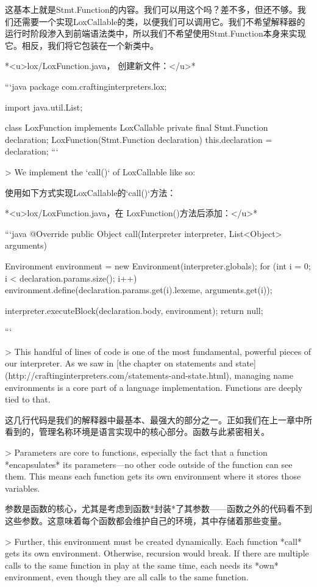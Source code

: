 \documentclass[cn,11pt,chinese]{elegantbook}
\begin{document}
{{{{{{{{这基本上就是Stmt.Function的内容。我们可以用这个吗？差不多，但还不够。我们还需要一个实现LoxCallable的类，以便我们可以调用它。我们不希望解释器的运行时阶段渗入到前端语法类中，所以我们不希望使用Stmt.Function本身来实现它。相反，我们将它包装在一个新类中。

*<u>lox/LoxFunction.java， 创建新文件：</u>*

```java
package com.craftinginterpreters.lox;

import java.util.List;

class LoxFunction implements LoxCallable {
  private final Stmt.Function declaration;
  LoxFunction(Stmt.Function declaration) {
    this.declaration = declaration;
  }
}
```

> We implement the `call()` of LoxCallable like so:

使用如下方式实现LoxCallable的`call()`方法：

*<u>lox/LoxFunction.java，在 LoxFunction()方法后添加：</u>*

```java
  @Override
  public Object call(Interpreter interpreter,
                     List<Object> arguments) {
    Environment environment = new Environment(interpreter.globals);
    for (int i = 0; i < declaration.params.size(); i++) {
      environment.define(declaration.params.get(i).lexeme,
          arguments.get(i));
    }

    interpreter.executeBlock(declaration.body, environment);
    return null;
  }
```

> This handful of lines of code is one of the most fundamental, powerful pieces of our interpreter. As we saw in [the chapter on statements and state](http://craftinginterpreters.com/statements-and-state.html), managing name environments is a core part of a language implementation. Functions are deeply tied to that.

这几行代码是我们的解释器中最基本、最强大的部分之一。正如我们在上一章中所看到的，管理名称环境是语言实现中的核心部分。函数与此紧密相关。

> Parameters are core to functions, especially the fact that a function *encapsulates* its parameters—no other code outside of the function can see them. This means each function gets its own environment where it stores those variables.

参数是函数的核心，尤其是考虑到函数*封装*了其参数——函数之外的代码看不到这些参数。这意味着每个函数都会维护自己的环境，其中存储着那些变量。

> Further, this environment must be created dynamically. Each function *call* gets its own environment. Otherwise, recursion would break. If there are multiple calls to the same function in play at the same time, each needs its *own* environment, even though they are all calls to the same function.

}}}}}}}}
\end{document}
